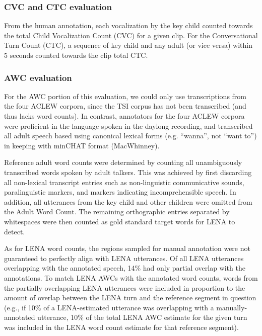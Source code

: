 \documentclass[english,floatsintext,man]{apa6}
\begin{document}
\subsubsection{CVC and CTC evaluation}\label{cvc-and-ctc-evaluation}

From the human annotation, each vocalization by the key child counted
towards the total Child Vocalization Count (CVC) for a given clip. For
the Conversational Turn Count (CTC), a sequence of key child and any
adult (or vice versa) within 5 seconds counted towards the clip total
CTC.

\subsubsection{AWC evaluation}\label{awc-evaluation}

For the AWC portion of this evaluation, we could only use transcriptions
from the four ACLEW corpora, since the TSI corpus has not been
transcribed (and thus lacks word counts). In contrast, annotators for
the four ACLEW corpora were proficient in the language spoken in the
daylong recording, and transcribed all adult speech based using
canonical lexical forms (e.g. \enquote{wanna}, not \enquote{want to}) in
keeping with minCHAT format (MacWhinney).

Reference adult word counts were determined by counting all
unambiguously transcribed words spoken by adult talkers. This was
achieved by first discarding all non-lexical transcript entries such as
non-linguistic communicative sounds, paralinguistic markers, and markers
indicating incomprehensible speech. In addition, all utterances from the
key child and other children were omitted from the Adult Word Count. The
remaining orthographic entries separated by whitespaces were then
counted as gold standard target words for LENA to detect.

As for LENA word counts, the regions sampled for manual annotation were
not guaranteed to perfectly align with LENA utterances. Of all LENA
utterances overlapping with the annotated speech, 14\% had only partial
overlap with the annotations. To match LENA AWCs with the annotated word
counts, words from the partially overlapping LENA utterances were
included in proportion to the amount of overlap between the LENA turn
and the reference segment in question (e.g., if 10\% of a LENA-estimated
utterance was overlapping with a manually-annotated utterance, 10\% of
the total LENA AWC estimate for the given turn was included in the LENA
word count estimate for that reference segment).
\end{document}
